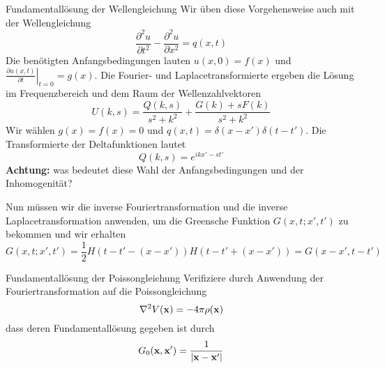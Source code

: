 \begin{example}{Fundamentallösung der Wellengleichung}
Wir üben diese Vorgehensweise auch mit der Wellengleichung
\begin{equation}
	\frac{\partial^2 u}{\partial t^2}-\frac{\partial^2 u}{\partial x^2}=q(x,t)
	\label{eqnwave}
\end{equation}
Die benötigten Anfangsbedingungen lauten $u(x,0)=f(x)$ und $\left.\frac{\partial
u(x,t)}{\partial t}\right|_{t=0}=g(x)$. Die Fourier- und Laplacetransformierte
ergeben die Lösung im Frequenzbereich und dem Raum der Wellenzahlvektoren 
\begin{equation}
	U(k,s)=\frac{Q(k,s)}{s^2+k^2}+\frac{G(k)+sF(k)}{s^2+k^2}
	\label{eqnuofkands}
\end{equation}
Wir wählen $g(x)=f(x)=0$ und $q(x,t)=\delta(x-x')\delta(t-t')$. Die
Transformierte der Deltafunktionen lautet
\[ Q(k,s)=e^{ikx'-st'}\]
{\bf Achtung:} was bedeutet diese Wahl der Anfangsbedingungen und der Inhomogenität?

Nun müssen wir die inverse Fouriertransformation und die inverse Laplacetransformation anwenden, um die 
Greensche Funktion $G(x,t;x',t')$ zu bekommen und wir erhalten
\begin{equation}
	G(x,t;x',t')=\frac{1}{2}H\left(t-t'-(x-x')\right)H\left(t-t'+(x-x')\right)=G(x-x',t-t')
	\label{eq:GFwave}
\end{equation}
\end{example}

\begin{example}{Fundamentallösung der Poissongleichung}
Verifiziere durch Anwendung der Fouriertransformation auf die Poissongleichung
\begin{equation}
	\nabla^2 V(\mathbf{x})=-4\pi\rho(\mathbf{x})
	\label{eq:Poisson}
\end{equation}
dass deren Fundamentallösung gegeben ist durch 
\begin{equation}
	G_0(\mathbf{x},\mathbf{x}')=\frac{1}{|\mathbf{x}-\mathbf{x}'|}
	\label{eq:FSPoisson}
\end{equation}
\end{example}
